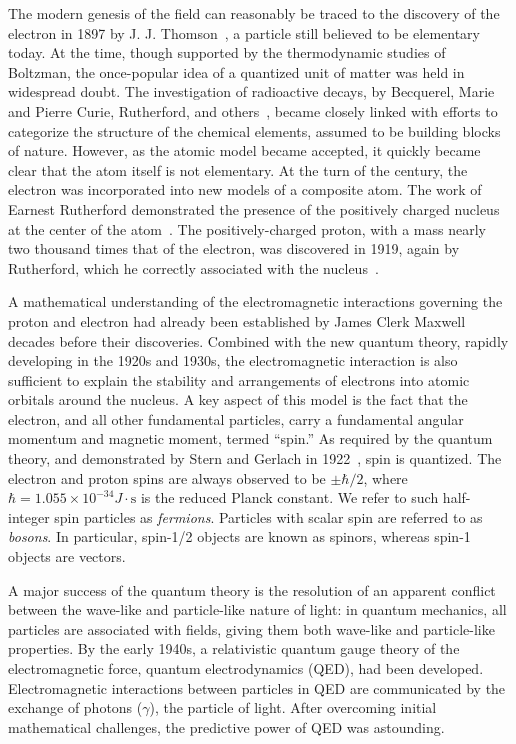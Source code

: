 The modern genesis of the field can reasonably be traced to 
the discovery of the electron in 1897 by J. J. Thomson~\cite{doi:10.1080/14786449708621070}, a particle still
believed to be elementary today.
At the time, though supported by the thermodynamic studies of Boltzman,
the once-popular idea of a quantized unit of matter was
held in widespread doubt. 
The investigation of radioactive decays, by Becquerel,
Marie and Pierre Curie, Rutherford, and others~\cite{RADVANYI2017544}, 
became closely linked with efforts to categorize
the structure of the chemical elements, assumed to be
building blocks of nature. 
However, as the atomic model became accepted, 
it quickly became clear that the atom itself is not elementary.
At the turn of the century, the electron was incorporated into 
new models of a composite atom.
The work of Earnest Rutherford demonstrated the presence of the
positively charged nucleus at the center of the atom~\cite{Rutherford:1911zz}.
The positively-charged proton, with a mass nearly two thousand times
that of the electron, was discovered in 1919, again by Rutherford,
which he correctly associated with the 
nucleus~\cite{doi:10.1080/14786440608635919}.

A mathematical understanding of the electromagnetic interactions 
governing the proton and electron had
already been established by James Clerk Maxwell decades before their discoveries.
Combined with the new quantum theory, rapidly developing in the 1920s and 1930s, the electromagnetic
interaction is also sufficient to explain the stability and arrangements of
electrons into atomic orbitals around the nucleus. 
A key aspect of this model is the fact that the electron, and all other
fundamental particles, carry a fundamental
angular momentum and magnetic moment, termed ``spin.'' 
As required by the quantum theory, and 
demonstrated by Stern and Gerlach in 1922~\cite{1922ZPhy....9..349G},
spin is quantized.
The electron and proton spins are always observed to be $\pm\hbar/2$, where 
$\hbar=1.055\times 10^{-34}\unit{J}\cdot\mathrm{s}$
is the reduced Planck constant.
We refer to such half-integer spin particles as \emph{fermions}. Particles
with scalar spin are referred to as \emph{bosons}. In particular, spin-1/2 objects
are known as spinors, whereas spin-1 objects are vectors.

A major success of the quantum theory is the resolution of an apparent
conflict between the wave-like and particle-like nature of light:
in quantum mechanics, all particles are associated with fields, giving
them both wave-like and particle-like properties. 
By the early 1940s, a relativistic quantum gauge theory of the electromagnetic force,
quantum electrodynamics (QED), had
been developed. Electromagnetic interactions 
between particles in QED are communicated by the exchange of photons ($\gamma$),
the particle of light. After overcoming initial mathematical challenges, 
the predictive power of QED was astounding.

